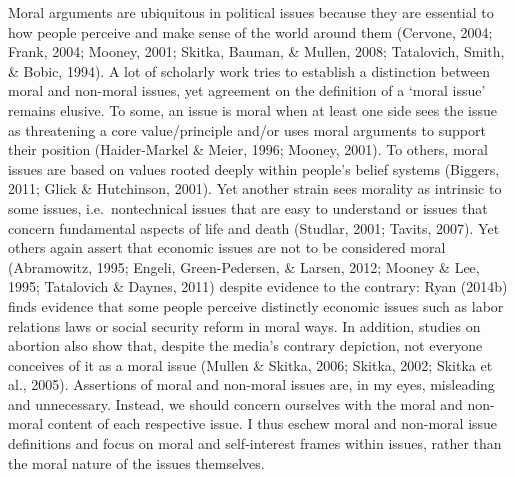 \documentclass[12pt,econ]{sources/authesis}
\begin{document}
Moral arguments are ubiquitous in political issues because they are essential to how people perceive and make sense of the world around them (Cervone, 2004; Frank, 2004; Mooney, 2001; Skitka, Bauman, \& Mullen, 2008; Tatalovich, Smith, \& Bobic, 1994). A lot of scholarly work tries to establish a distinction between moral and non-moral issues, yet agreement on the definition of a `moral issue' remains elusive. To some, an issue is moral when at least one side sees the issue as threatening a core value/principle and/or uses moral arguments to support their position (Haider-Markel \& Meier, 1996; Mooney, 2001). To others, moral issues are based on values rooted deeply within people's belief systems (Biggers, 2011; Glick \& Hutchinson, 2001). Yet another strain sees morality as intrinsic to some issues, i.e.~nontechnical issues that are easy to understand or issues that concern fundamental aspects of life and death (Studlar, 2001; Tavits, 2007). Yet others again assert that economic issues are not to be considered moral (Abramowitz, 1995; Engeli, Green-Pedersen, \& Larsen, 2012; Mooney \& Lee, 1995; Tatalovich \& Daynes, 2011) despite evidence to the contrary: Ryan (2014b) finds evidence that some people perceive distinctly economic issues such as labor relations laws or social security reform in moral ways. In addition, studies on abortion also show that, despite the media's contrary depiction, not everyone conceives of it as a moral issue (Mullen \& Skitka, 2006; Skitka, 2002; Skitka et al., 2005). Assertions of moral and non-moral issues are, in my eyes, misleading and unnecessary. Instead, we should concern ourselves with the moral and non-moral content of each respective issue. I thus eschew moral and non-moral issue definitions and focus on moral and self-interest frames within issues, rather than the moral nature of the issues themselves.
\end{document}
